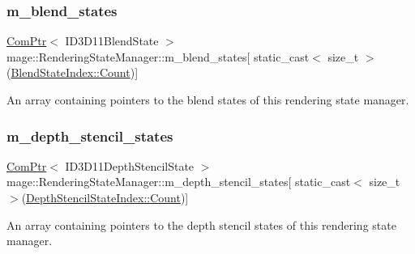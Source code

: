 \subsubsection{\texorpdfstring{m\+\_\+blend\+\_\+states}{m\_blend\_states}}
{\footnotesize\ttfamily \hyperlink{namespacemage_ae74f374780900893caa5555d1031fd79}{Com\+Ptr}$<$ I\+D3\+D11\+Blend\+State $>$ mage\+::\+Rendering\+State\+Manager\+::m\+\_\+blend\+\_\+states\mbox{[} static\+\_\+cast$<$ size\+\_\+t $>$(\hyperlink{classmage_1_1_rendering_state_manager_ae8ea18eb352ae4cf9e23b41f10578984ae93f994f01c537c4e2f7d8528c3eb5e9}{Blend\+State\+Index\+::\+Count})\mbox{]}\hspace{0.3cm}{\ttfamily [private]}}

An array containing pointers to the blend states of this rendering state manager. \hypertarget{classmage_1_1_rendering_state_manager_a8bd01105789b3aac90ee56a0322f98e8}{}\label{classmage_1_1_rendering_state_manager_a8bd01105789b3aac90ee56a0322f98e8} 
\subsubsection{\texorpdfstring{m\+\_\+depth\+\_\+stencil\+\_\+states}{m\_depth\_stencil\_states}}
{\footnotesize\ttfamily \hyperlink{namespacemage_ae74f374780900893caa5555d1031fd79}{Com\+Ptr}$<$ I\+D3\+D11\+Depth\+Stencil\+State $>$ mage\+::\+Rendering\+State\+Manager\+::m\+\_\+depth\+\_\+stencil\+\_\+states\mbox{[} static\+\_\+cast$<$ size\+\_\+t $>$(\hyperlink{classmage_1_1_rendering_state_manager_abcfd0e984d2ba2710320882430d6871aae93f994f01c537c4e2f7d8528c3eb5e9}{Depth\+Stencil\+State\+Index\+::\+Count})\mbox{]}\hspace{0.3cm}{\ttfamily [private]}}

An array containing pointers to the depth stencil states of this rendering state manager. \hypertarget{classmage_1_1_rendering_state_manager_aa9ecd4ca82954b3d457e811bf44d835a}{}\label{classmage_1_1_rendering_state_manager_aa9ecd4ca82954b3d457e811bf44d835a} 

